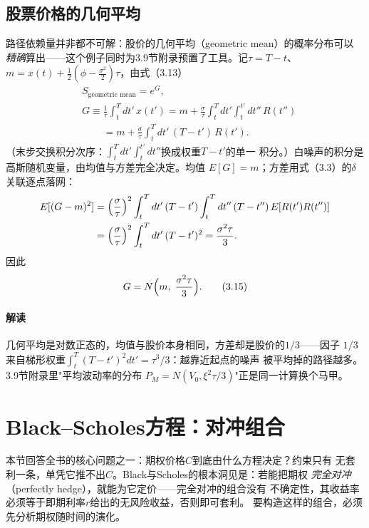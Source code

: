 \subsection*{股票价格的几何平均}

路径依赖量并非都不可解：股价的几何平均（geometric mean）的概率分布可以
\emph{精确}算出——这个例子同时为3.9节附录预置了工具。记$\tau=T-t$、
$m=x(t)+\frac{1}{2}(\phi-\frac{\sigma^{2}}{2})\tau$，由式（3.13）
\begin{align*}
&S_{\text{geometric mean}}=e^{G},\\
&G\equiv\frac{1}{\tau}\int_{t}^{T}dt'\,x(t')
=m+\frac{\sigma}{\tau}\int_{t}^{T}dt'\int_{t}^{t'}dt''\,R(t'')\\
&\phantom{G\equiv}=m+\frac{\sigma}{\tau}\int_{t}^{T}dt'\,(T-t')\,R(t').
\end{align*}
（末步交换积分次序：$\int_t^T dt'\int_t^{t'}dt''$换成权重$T-t'$的单一
积分。）白噪声的积分是高斯随机变量，由均值与方差完全决定。均值
$E[G]=m$；方差用式（3.3）的$\delta$关联逐点落网：
\begin{align*}
E[(G-m)^{2}]
&=\Bigl(\frac{\sigma}{\tau}\Bigr)^{2}\int_{t}^{T}dt'\,(T-t')
\int_{t}^{T}dt''\,(T-t'')\,E[R(t')R(t'')]\\
&=\Bigl(\frac{\sigma}{\tau}\Bigr)^{2}\int_{t}^{T}dt'\,(T-t')^{2}
=\frac{\sigma^{2}\tau}{3}.
\end{align*}
因此
\begin{equation*}
G=N\Bigl(m,\;\frac{\sigma^{2}\tau}{3}\Bigr).
\tag{3.15}
\end{equation*}
\paragraph{解读}
几何平均是对数正态的，均值与股价本身相同，方差却是股价的$1/3$——因子
$1/3$来自梯形权重$\int_t^T (T-t')^{2}dt'=\tau^{3}/3$：越靠近起点的噪声
被平均掉的路径越多。3.9节附录里"平均波动率的分布
$P_M=N(V_0,\xi^{2}\tau/3)$"正是同一计算换个马甲。

\section{Black--Scholes方程：对冲组合}

本节回答全书的核心问题之一：期权价格$C$到底由什么方程决定？约束只有
无套利一条，单凭它推不出$C$。Black与Scholes的根本洞见是：若能把期权
\emph{完全对冲}（perfectly hedge），就能为它定价——完全对冲的组合没有
不确定性，其收益率必须等于即期利率$r$给出的无风险收益，否则即可套利。
要构造这样的组合，必须先分析期权随时间的演化。

